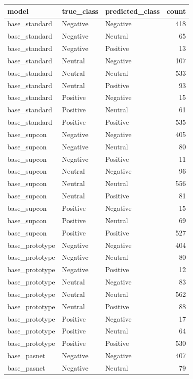\begin{tabular}{lllr}
\toprule
model & true\_class & predicted\_class & count \\
\midrule
base\_standard & Negative & Negative & 418 \\
base\_standard & Negative & Neutral & 65 \\
base\_standard & Negative & Positive & 13 \\
base\_standard & Neutral & Negative & 107 \\
base\_standard & Neutral & Neutral & 533 \\
base\_standard & Neutral & Positive & 93 \\
base\_standard & Positive & Negative & 15 \\
base\_standard & Positive & Neutral & 61 \\
base\_standard & Positive & Positive & 535 \\
base\_supcon & Negative & Negative & 405 \\
base\_supcon & Negative & Neutral & 80 \\
base\_supcon & Negative & Positive & 11 \\
base\_supcon & Neutral & Negative & 96 \\
base\_supcon & Neutral & Neutral & 556 \\
base\_supcon & Neutral & Positive & 81 \\
base\_supcon & Positive & Negative & 15 \\
base\_supcon & Positive & Neutral & 69 \\
base\_supcon & Positive & Positive & 527 \\
base\_prototype & Negative & Negative & 404 \\
base\_prototype & Negative & Neutral & 80 \\
base\_prototype & Negative & Positive & 12 \\
base\_prototype & Neutral & Negative & 83 \\
base\_prototype & Neutral & Neutral & 562 \\
base\_prototype & Neutral & Positive & 88 \\
base\_prototype & Positive & Negative & 17 \\
base\_prototype & Positive & Neutral & 64 \\
base\_prototype & Positive & Positive & 530 \\
base\_pasnet & Negative & Negative & 407 \\
base\_pasnet & Negative & Neutral & 79 \\

\end{tabular}
